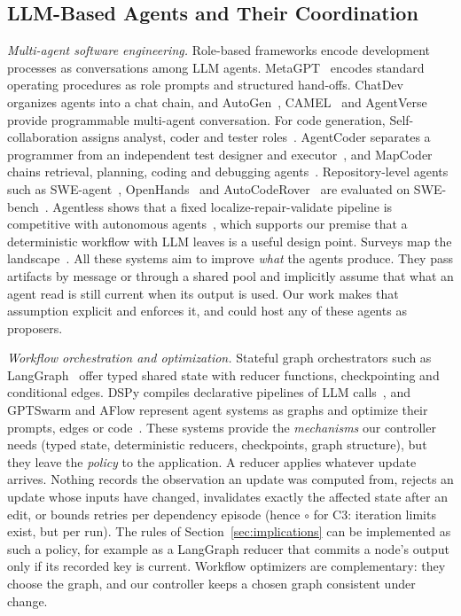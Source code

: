 \subsection{LLM-Based Agents and Their Coordination}
\emph{Multi-agent software engineering.} Role-based frameworks encode development processes as conversations among LLM agents. MetaGPT~\cite{metagpt} encodes standard operating procedures as role prompts and structured hand-offs. ChatDev~\cite{chatdev} organizes agents into a chat chain, and AutoGen~\cite{autogen}, CAMEL~\cite{li2023camel} and AgentVerse~\cite{chen2024agentverse} provide programmable multi-agent conversation. For code generation, Self-collaboration assigns analyst, coder and tester roles~\cite{dong2024selfcollab}. AgentCoder separates a programmer from an independent test designer and executor~\cite{huang2023agentcoder}, and MapCoder chains retrieval, planning, coding and debugging agents~\cite{islam2024mapcoder}. Repository-level agents such as SWE-agent~\cite{sweagent}, OpenHands~\cite{wang2025openhands} and AutoCodeRover~\cite{zhang2024autocoderover} are evaluated on SWE-bench~\cite{swebench}. Agentless shows that a fixed localize-repair-validate pipeline is competitive with autonomous agents~\cite{xia2025agentless}, which supports our premise that a deterministic workflow with LLM leaves is a useful design point. Surveys map the landscape~\cite{hou2024llm4se,he2025mas,liu2024agentsurvey,wang2024agents}. All these systems aim to improve \emph{what} the agents produce. They pass artifacts by message or through a shared pool and implicitly assume that what an agent read is still current when its output is used. Our work makes that assumption explicit and enforces it, and could host any of these agents as proposers.

\emph{Workflow orchestration and optimization.} Stateful graph orchestrators such as LangGraph~\cite{langgraph} offer typed shared state with reducer functions, checkpointing and conditional edges. DSPy compiles declarative pipelines of LLM calls~\cite{khattab2024dspy}, and GPTSwarm and AFlow represent agent systems as graphs and optimize their prompts, edges or code~\cite{zhuge2024gptswarm,zhang2025aflow}. These systems provide the \emph{mechanisms} our controller needs (typed state, deterministic reducers, checkpoints, graph structure), but they leave the \emph{policy} to the application. A reducer applies whatever update arrives. Nothing records the observation an update was computed from, rejects an update whose inputs have changed, invalidates exactly the affected state after an edit, or bounds retries per dependency episode (hence $\circ$ for C3: iteration limits exist, but per run). The rules of Section~\ref{sec:implications} can be implemented as such a policy, for example as a LangGraph reducer that commits a node's output only if its recorded key is current. Workflow optimizers are complementary: they choose the graph, and our controller keeps a chosen graph consistent under change.


